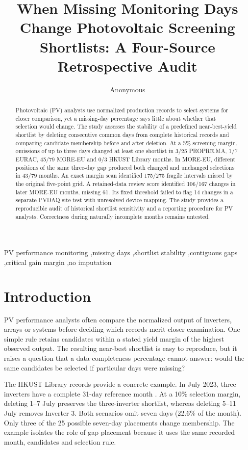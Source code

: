 \documentclass[preprint,12pt]{elsarticle}
\begin{document}
\begin{frontmatter}
\title{When Missing Monitoring Days Change Photovoltaic Screening Shortlists: A Four-Source Retrospective Audit}
\author{Anonymous}
\begin{abstract}
Photovoltaic (PV) analysts use normalized production records to select systems for closer comparison, yet a missing-day percentage says little about whether that selection would change. The study assesses the stability of a predefined near-best-yield shortlist by deleting consecutive common days from complete historical records and comparing candidate membership before and after deletion. At a 5\% screening margin, omissions of up to three days changed at least one shortlist in 3/25 PROPRE.MA, 1/7 EURAC, 45/79 MORE-EU and 0/3 HKUST Library months. In MORE-EU, different positions of the same three-day gap produced both changed and unchanged selections in 43/79 months. An exact margin scan identified 175/275 fragile intervals missed by the original five-point grid. A retained-data review score identified 106/167 changes in later MORE-EU months, missing 61. Its fixed threshold failed to flag 14 changes in a separate PVDAQ site test with unresolved device mapping. The study provides a reproducible audit of historical shortlist sensitivity and a reporting procedure for PV analysts. Correctness during naturally incomplete months remains untested.
\end{abstract}
\begin{keyword}
PV performance monitoring \sep missing days \sep shortlist stability \sep contiguous gaps \sep critical gain margin \sep no imputation
\end{keyword}
\end{frontmatter}

\section{Introduction}
PV performance analysts often compare the normalized output of inverters, arrays or systems before deciding which records merit closer examination. One simple rule retains candidates within a stated yield margin of the highest observed output. The resulting near-best shortlist is easy to reproduce, but it raises a question that a data-completeness percentage cannot answer: would the same candidates be selected if particular days were missing?

The HKUST Library records provide a concrete example. In July 2023, three inverters have a complete 31-day reference month \cite{lin2025,hkust2024}. At a 10\% selection margin, deleting 1--7 July preserves the three-inverter shortlist, whereas deleting 5--11 July removes Inverter 3. Both scenarios omit seven days (22.6\% of the month). Only three of the 25 possible seven-day placements change membership. The example isolates the role of gap placement because it uses the same recorded month, candidates and selection rule.
\end{document}
